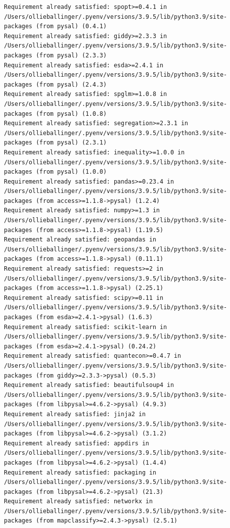 \documentclass[
  letterpaper,
  DIV=11,
  numbers=noendperiod]{scrreprt}
\begin{document}
\begin{verbatim}
Requirement already satisfied: spopt>=0.4.1 in /Users/ollieballinger/.pyenv/versions/3.9.5/lib/python3.9/site-packages (from pysal) (0.4.1)
Requirement already satisfied: giddy>=2.3.3 in /Users/ollieballinger/.pyenv/versions/3.9.5/lib/python3.9/site-packages (from pysal) (2.3.3)
Requirement already satisfied: esda>=2.4.1 in /Users/ollieballinger/.pyenv/versions/3.9.5/lib/python3.9/site-packages (from pysal) (2.4.3)
Requirement already satisfied: spglm>=1.0.8 in /Users/ollieballinger/.pyenv/versions/3.9.5/lib/python3.9/site-packages (from pysal) (1.0.8)
Requirement already satisfied: segregation>=2.3.1 in /Users/ollieballinger/.pyenv/versions/3.9.5/lib/python3.9/site-packages (from pysal) (2.3.1)
Requirement already satisfied: inequality>=1.0.0 in /Users/ollieballinger/.pyenv/versions/3.9.5/lib/python3.9/site-packages (from pysal) (1.0.0)
Requirement already satisfied: pandas>=0.23.4 in /Users/ollieballinger/.pyenv/versions/3.9.5/lib/python3.9/site-packages (from access>=1.1.8->pysal) (1.2.4)
Requirement already satisfied: numpy>=1.3 in /Users/ollieballinger/.pyenv/versions/3.9.5/lib/python3.9/site-packages (from access>=1.1.8->pysal) (1.19.5)
Requirement already satisfied: geopandas in /Users/ollieballinger/.pyenv/versions/3.9.5/lib/python3.9/site-packages (from access>=1.1.8->pysal) (0.11.1)
Requirement already satisfied: requests>=2 in /Users/ollieballinger/.pyenv/versions/3.9.5/lib/python3.9/site-packages (from access>=1.1.8->pysal) (2.25.1)
Requirement already satisfied: scipy>=0.11 in /Users/ollieballinger/.pyenv/versions/3.9.5/lib/python3.9/site-packages (from esda>=2.4.1->pysal) (1.6.3)
Requirement already satisfied: scikit-learn in /Users/ollieballinger/.pyenv/versions/3.9.5/lib/python3.9/site-packages (from esda>=2.4.1->pysal) (0.24.2)
Requirement already satisfied: quantecon>=0.4.7 in /Users/ollieballinger/.pyenv/versions/3.9.5/lib/python3.9/site-packages (from giddy>=2.3.3->pysal) (0.5.3)
Requirement already satisfied: beautifulsoup4 in /Users/ollieballinger/.pyenv/versions/3.9.5/lib/python3.9/site-packages (from libpysal>=4.6.2->pysal) (4.9.3)
Requirement already satisfied: jinja2 in /Users/ollieballinger/.pyenv/versions/3.9.5/lib/python3.9/site-packages (from libpysal>=4.6.2->pysal) (3.1.2)
Requirement already satisfied: appdirs in /Users/ollieballinger/.pyenv/versions/3.9.5/lib/python3.9/site-packages (from libpysal>=4.6.2->pysal) (1.4.4)
Requirement already satisfied: packaging in /Users/ollieballinger/.pyenv/versions/3.9.5/lib/python3.9/site-packages (from libpysal>=4.6.2->pysal) (21.3)
Requirement already satisfied: networkx in /Users/ollieballinger/.pyenv/versions/3.9.5/lib/python3.9/site-packages (from mapclassify>=2.4.3->pysal) (2.5.1)

\end{verbatim}
\end{document}
